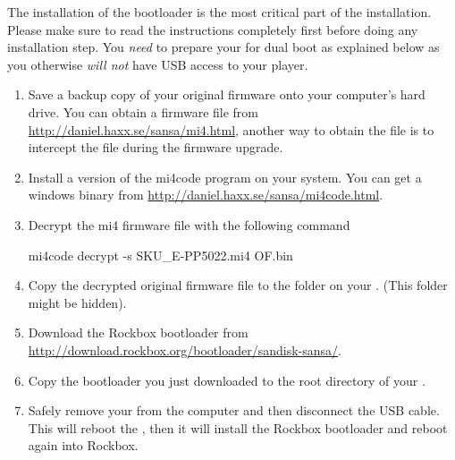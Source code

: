 
The installation of the bootloader is the most critical part of the
installation. Please make sure to read the instructions completely
first before doing any installation step. You \emph{need} to
prepare your \dap{} for dual boot as explained below as you
otherwise \emph{will not} have USB access to your player.

\begin{enumerate}
\item Save a backup copy of your original firmware onto your computer's hard drive.
  You can obtain a firmware file from \url{http://daniel.haxx.se/sansa/mi4.html},
  another way to obtain the file is to intercept the file during the firmware
  upgrade.
\item Install a version of the mi4code program on your system.
  You can get a windows binary from
  \url{http://daniel.haxx.se/sansa/mi4code.html}.
\item Decrypt the mi4 firmware file with the following command
  \begin{code}
    mi4code decrypt -s SKU_E-PP5022.mi4 OF.bin
  \end{code}
\item Copy the decrypted original firmware file  to the 
   folder on your \dap{}. (This folder might be hidden).
\item Download the Rockbox bootloader from 
  \url{http://download.rockbox.org/bootloader/sandisk-sansa/}.
\item Copy the bootloader you just downloaded to the root directory
  of your \dap{}.
\item Safely remove your \dap{} from the computer and then disconnect the
  USB cable. This will reboot the \dap{}, then it will install the Rockbox
  bootloader and reboot again into Rockbox.
\end{enumerate}

